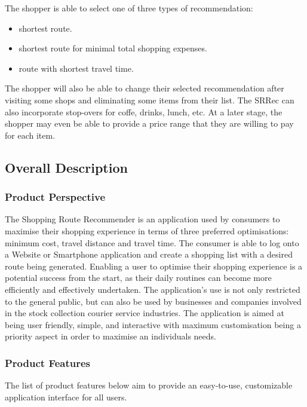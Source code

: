 \documentclass[10pt, a4paper, onecolumn]{scrartcl}
\begin{document}
			The shopper is able to select one of three types of recommendation:
			\begin{itemize}
				\item shortest route.
				\item shortest route for minimal total shopping expenses.
				\item route with shortest travel time.
			\end{itemize}
			
			The shopper will also be able to change their selected recommendation after visiting some shops and eliminating some items from their list. The SRRec can also incorporate stop-overs for coffe, drinks, lunch, etc. At a later stage, the shopper may even be able to provide a price range that they are willing to pay for each item.
		
	\subsection{Overall Description}
	
		\subsubsection{Product Perspective}
		
			The Shopping Route Recommender is an application used by consumers to maximise their shopping experience in terms of three preferred optimisations: minimum cost, travel distance and travel time. The consumer is able to log onto a Website or Smartphone application and create a shopping list with a desired route being generated.  Enabling a user to optimise their shopping experience is a potential success from the start, as their daily routines can become more efficiently and effectively undertaken. The application's use is not only restricted to the general public, but can also be used by businesses and companies involved in the stock collection courier service industries. The application is aimed at being user friendly, simple, and interactive with maximum customisation being a priority aspect in order to maximise an individuals needs. 
		
		\subsubsection{Product Features}
		
			The list of product features below aim to provide an easy-to-use, customizable application interface for all users. 
		
\end{document}
